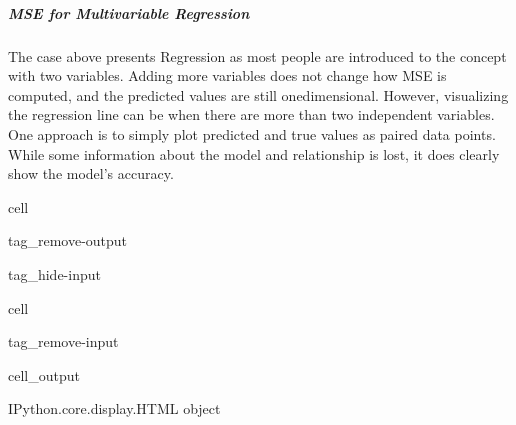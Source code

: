 \documentclass[letterpaper,10pt,english]{jupyterBook}
\begin{document}
\subparagraph{MSE for Multivariable Regression}
\label{\detokenize{task2_c/example_sup_reg/sup_reg_ex_accuracy:mse-for-multivariable-regression}}\label{\detokenize{task2_c/example_sup_reg/sup_reg_ex_accuracy:sup-reg-ex-develop-accuracy-mse-2}}
\sphinxAtStartPar
The case above presents Regression as most people are introduced to the concept \sphinxhyphen{}with two variables. Adding more variables does not change how MSE is computed, and the predicted values are still one\sphinxhyphen{}dimensional. However, visualizing the regression line can be  when there are more than two independent variables. One approach is to simply plot predicted and true values as paired data points. While some information about the model and relationship is lost, it does clearly show the model’s accuracy.

\begin{sphinxuseclass}{cell}
\begin{sphinxuseclass}{tag_remove-output}
\begin{sphinxuseclass}{tag_hide-input}
\end{sphinxuseclass}
\end{sphinxuseclass}
\end{sphinxuseclass}
\begin{sphinxuseclass}{cell}
\begin{sphinxuseclass}{tag_remove-input}\begin{sphinxVerbatimOutput}

\begin{sphinxuseclass}{cell_output}
\begin{sphinxVerbatim}[commandchars=\\\{\}]
\PYGZlt{}IPython.core.display.HTML object\PYGZgt{}
\end{sphinxVerbatim}

\end{sphinxuseclass}\end{sphinxVerbatimOutput}

\end{sphinxuseclass}
\end{sphinxuseclass}
\end{document}
